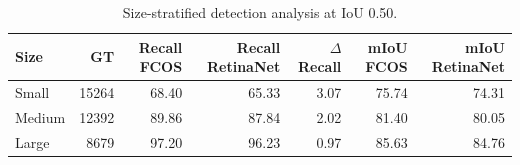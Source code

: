\begin{table}[t]
\centering
\caption{Size-stratified detection analysis at IoU 0.50.}
\label{tab:size-analysis}
\begin{tabular}{lrrrrrr}
\toprule
Size & GT & Recall FCOS & Recall RetinaNet & $\Delta$ Recall & mIoU FCOS & mIoU RetinaNet \\
\midrule
Small & 15264 & 68.40 & 65.33 & 3.07 & 75.74 & 74.31 \\
Medium & 12392 & 89.86 & 87.84 & 2.02 & 81.40 & 80.05 \\
Large & 8679 & 97.20 & 96.23 & 0.97 & 85.63 & 84.76 \\
\bottomrule
\end{tabular}
\end{table}
